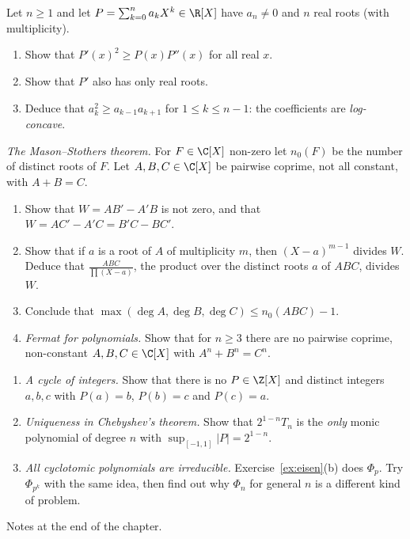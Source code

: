 \begin{exercise}[$\star\star\star$]\label{ex:logconcave}
Let $n\ge1$ and let $P=\sum_{k=0}^na_kX^k\in\R[X]$ have $a_n\ne0$ and $n$ real roots (with multiplicity).
\begin{enumerate}[label=(\alph*)]
\item Show that $P'(x)^2\ge P(x)P''(x)$ for all real $x$.
\item Show that $P'$ also has only real roots.
\item Deduce that $a_k^2\ge a_{k-1}a_{k+1}$ for $1\le k\le n-1$: the coefficients are \emph{log-concave}.
\end{enumerate}
\end{exercise}

\begin{exercise}[$\star\star\star$]\label{ex:mason}
\emph{The Mason--Stothers theorem.} For $F\in\C[X]$ non-zero let $n_0(F)$ be the number of distinct roots of $F$. Let $A,B,C\in\C[X]$ be
pairwise coprime, not all constant, with $A+B=C$.
\begin{enumerate}[label=(\alph*)]
\item Show that $W=AB'-A'B$ is not zero, and that $W=AC'-A'C=B'C-BC'$.
\item Show that if $a$ is a root of $A$ of multiplicity $m$, then $(X-a)^{m-1}$ divides $W$. Deduce that $\frac{ABC}{\prod(X-a)}$, the product over
the distinct roots $a$ of $ABC$, divides $W$.
\item Conclude that $\max(\deg A,\deg B,\deg C)\le n_0(ABC)-1$.
\item \emph{Fermat for polynomials.} Show that for $n\ge3$ there are no pairwise coprime, non-constant $A,B,C\in\C[X]$ with $A^n+B^n=C^n$.
\end{enumerate}
\end{exercise}

\begin{challenge}
\begin{enumerate}[label=(\arabic*)]
\item \emph{A cycle of integers.} Show that there is no $P\in\Z[X]$ and distinct integers $a,b,c$ with $P(a)=b$, $P(b)=c$ and $P(c)=a$.
\item \emph{Uniqueness in Chebyshev's theorem.} Show that $2^{1-n}T_n$ is the \emph{only} monic polynomial of degree $n$ with $\sup_{[-1,1]}|P|=2^{1-n}$.
\item \emph{All cyclotomic polynomials are irreducible.} Exercise~\ref{ex:eisen}(b) does $\Phi_p$. Try $\Phi_{p^k}$ with the same idea, then find out why $\Phi_n$ for general $n$ is a different kind of problem.
\end{enumerate}
Notes at the end of the chapter.
\end{challenge}

